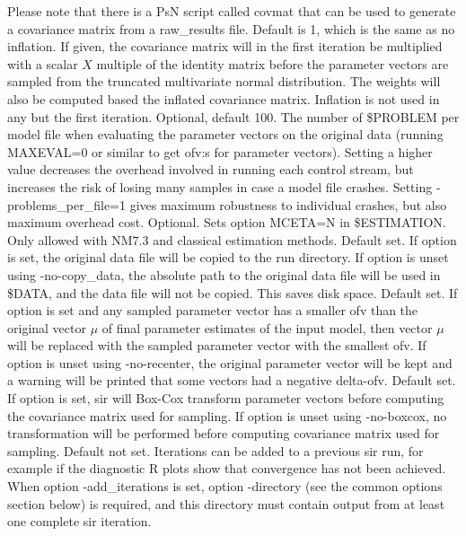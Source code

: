 \begin{optionlist}
Please note that there is a PsN script called covmat that can be used to generate a covariance matrix from a raw\_results file.
\nextopt
{}
Default is 1, which is the same as no inflation. If given, the covariance
matrix will in the first iteration be multiplied with a scalar $X$ multiple of the identity matrix
before the parameter vectors
are sampled from the truncated multivariate normal distribution.
The weights will also be computed based the inflated covariance matrix. 
Inflation is not used in any but the first iteration.
\nextopt
{}
Optional, default 100. The number of \$PROBLEM per model file when evaluating the parameter vectors
on the original data (running
MAXEVAL=0 or similar to get ofv:s for parameter vectors). Setting a higher value
decreases the overhead involved in running each control stream, but increases the 
risk of losing many samples in case a model file crashes. Setting -problems\_per\_file=1
gives maximum robustness to individual crashes, but also maximum overhead cost.
\nextopt
{}
Optional. Sets option MCETA=N in \$ESTIMATION. Only allowed with NM7.3 and classical estimation methods.
\nextopt
{}
Default set. If option is set, the original data file
will be copied to the run directory.
If option is unset using -no-copy\_data, the absolute path to the original data file will be used in
\$DATA, and the data file will not be copied. This saves disk space.
\nextopt
{}
Default set. If option is set and any sampled parameter vector has a smaller ofv than the original
vector $\mu$ of final parameter estimates of the input model, then vector $\mu$ will be replaced with
the sampled parameter vector with the smallest ofv.
If option is unset using -no-recenter, the original parameter vector will be kept
and a warning will be printed that some vectors had a negative delta-ofv.
\nextopt
{}
Default set. 
If option is set, sir will Box-Cox transform parameter vectors before computing
the covariance matrix used for sampling.
If option is unset using -no-boxcox, no transformation will be performed before computing covariance matrix
used for sampling.
\nextopt
{}
Default not set. 
Iterations can be added to a previous sir run, for example if the diagnostic R plots show that
convergence has not been achieved. When option -add\_iterations is set, option -directory 
(see the common options section below) is required,
and this directory must contain output from at least one complete sir iteration.


\end{optionlist}
